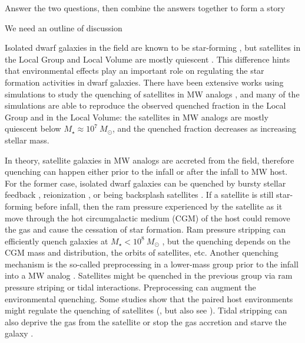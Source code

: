 \documentclass[twocolumn,astrosymb,twocolappendix]{aastex631}
\begin{document}
\begin{CJK*}{UTF8}{gbsn}
Answer the two questions, then combine the answers together to form a story

We need an outline of discussion


Isolated dwarf galaxies in the field are known to be star-forming \citep{Geha2012}, but satellites in the Local Group and Local Volume are mostly quiescent \citep{Grcevich2009,Spekkens2014,Wetzel2015,Putman2021,CarlstenELVES2022}. This difference hints that environmental effects play an important role on regulating the star formation activities in dwarf galaxies. There have been extensive works using simulations to study the quenching of satellites in MW analogs \citep[e.g.,][]{Simpson2018,Buck2019,Garrison-Kimmel2019,Simons2020,Joshi2021,Akins2021,Karunakaran2021,Font2022,Samuel2022}, and many of the simulations are able to reproduce the observed quenched fraction in the Local Group and in the Local Volume: the satellites in MW analogs are mostly quiescent below $M_\star\approx 10^7\ M_\odot$, and the quenched fraction decreases as increasing stellar mass. 

In theory, satellite galaxies in MW analogs are accreted from the field, therefore quenching can happen either prior to the infall or after the infall to MW host. For the former case, isolated dwarf galaxies can be quenched by bursty stellar feedback \citep[e.g.,][]{Bahe2015,Kazantzidis2017,ElBadry2018}, reionization \citep[e.g.,][]{Bullock2000,Benson2002,Somerville2002,Tollerud2018,Applebaum2021}, or being backsplash satellites \citep{Simpson2018}. If a satellite is still star-forming before infall, then the ram pressure \citep[e.g.,][]{GunnGott1972,McCarthy2008,Simpson2018,Tremmel2020,Samuel2022} experienced by the satellite as it move through the hot circumgalactic medium (CGM) of the host could remove the gas and cause the cessation of star formation. Ram pressure stripping can 
efficiently quench galaxies at $M_\star < 10^{8}\ M_\odot$ \citep{Fillingham2016,Simpson2018,Buck2019}, but the quenching depends on the CGM mass and distribution, the orbits of satellites, etc. Another quenching mechanism is the so-called preprocessing in a lower-mass group prior to the infall into a MW analog \citep{Wetzel2015b,Jahn2022,Samuel2022}. Satellites might be quenched in the previous group via ram pressure striping or tidal interactions.
Preprocessing can augment the environmental quenching. Some studies show that the paired host environments might regulate the quenching of satellites (\citealt{Garrison-Kimmel2019,Putman2021}, but also see \citealt{Samuel2022}). Tidal stripping can also deprive the gas from the satellite or stop the gas accretion and starve the galaxy \citep{Simpson2018}. 


\end{CJK*}
\end{document}
